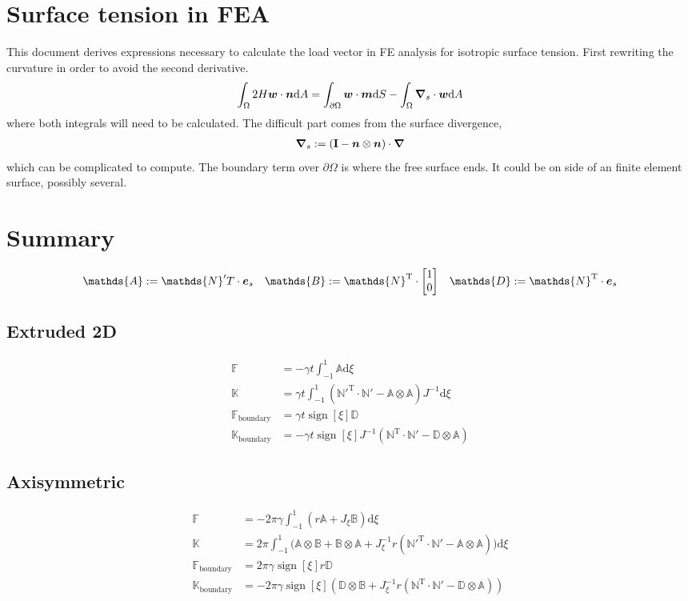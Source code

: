 \documentclass[a4paper,11pt]{article}
\renewcommand{\to}[1]{\text{\boldmath $#1$}} %
\newcommand{\ts}[1]{\text{\boldmath $\mathrm{#1}$}} %
\newcommand{\uv}[1]{\mathds{#1}}
\newcommand{\um}[1]{\mathds{#1}}
\newcommand{\intd}[1]{\mathrm{d}#1}
\newcommand{\T}{\mathrm{T}}
\newcommand{\defeq}{:=}
\newcommand{\boundary}{\text{boundary}}
\DeclareMathOperator{\sign}{sign}
\begin{document}
\section{Surface tension in FEA}
This document derives expressions necessary to calculate the load vector in FE analysis for isotropic surface tension. First rewriting the curvature in order to avoid the second derivative.
\begin{align}
 \int_\Omega 2 H \to w\cdot \to n\intd A = \int_{\partial\Omega} \to w\cdot\to m\intd S - \int_\Omega \to \nabla_s \cdot \to w \intd A
 \label{eq:curvature}
\end{align}
where both integrals will need to be calculated. The difficult part comes from the surface divergence,
\begin{align}
 \to \nabla_s \defeq \left(\ts I - \to n\otimes\to n \right)\cdot \to \nabla
\end{align}
which can be complicated to compute. The boundary term over $\partial\Omega$ is where the free surface ends. It could be on side of an finite element surface, possibly several.

\section{Summary}
\begin{align}
\uv A &\defeq {\um N}'^\T \cdot \to e_s & \uv B &\defeq {\um N}^\T \cdot \begin{bmatrix}1\\0\end{bmatrix} & \uv D \defeq \uv N^\T \cdot \to e_s
\end{align}
\subsection{Extruded 2D}
\begin{align}
 \uv F &= -\gamma t \int_{-1}^{1} \uv A \intd\xi\\
 \um K &= \gamma t \int_{-1}^{1} \left(\um N'^\T\cdot\um N' - \uv A\otimes\uv A\right) J^{-1} \intd\xi\\
 \uv F_\boundary &= \gamma t \sign[\xi] \uv D\\
 \um K_\boundary &= -\gamma t \sign[\xi]J^{-1} (\um N^\T \cdot \um N'- \uv D\otimes \uv A)
\end{align}

\subsection{Axisymmetric}
\begin{align}
  \uv F &= -2\pi \gamma \int_{-1}^{1} \left(r\uv A + J_\xi\uv B\right) \intd\xi\\
  \um K &= 2\pi \int_{-1}^{1} \bigg(
	\uv A \otimes \uv B +
	\uv B\otimes \uv A +
	J_\xi^{-1} r({\um N}'^\T \cdot {\um N}' - \uv A\otimes \uv A)
	\bigg)\intd\xi\\
 \uv F_\boundary &= 2\pi\gamma\sign[\xi] r \uv D\\
 \um K_\boundary &= -2 \pi \gamma\sign[\xi] \left(\uv D\otimes\uv B + J_\xi^{-1} r \left(\um N^\T\cdot\um N' -\uv D\otimes\uv A\right) \right)
\end{align}
\end{document}
